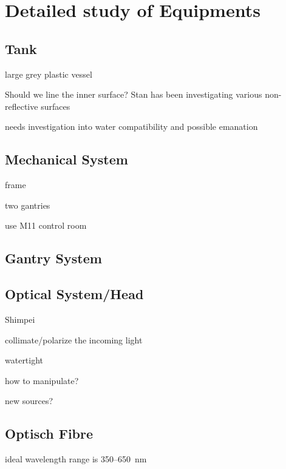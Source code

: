 \section{Detailed study of Equipments}





\subsection{Tank}

large grey plastic vessel

Should we line the inner surface? Stan has been investigating various
non-reflective surfaces

needs investigation into water compatibility and possible emanation





\subsection{Mechanical System}
frame

two gantries

use M11 control room






\subsection{Gantry System}

\subsection{Optical System/Head}

Shimpei

collimate/polarize the incoming light

watertight

how to manipulate?

new sources?


\subsection{Optisch Fibre}
ideal wavelength range is 350--650~nm

